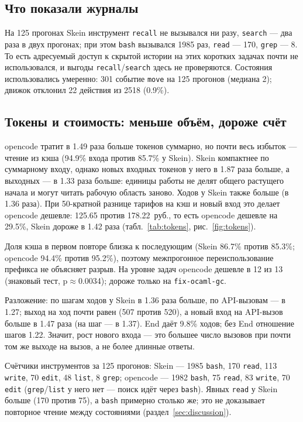 \documentclass[11pt,a4paper]{article}
\begin{document}
\subsection{Что показали журналы}

На 125 прогонах Skein инструмент \texttt{recall} не вызывался ни разу, \texttt{search} ---
два раза в двух прогонах; при этом \texttt{bash} вызывался 1985 раз, \texttt{read} --- 170,
\texttt{grep} --- 8. То есть адресуемый доступ к скрытой истории на этих коротких задачах
почти не использовался, и выгоды \texttt{recall}/\texttt{search} здесь не проверяются.
Состояния использовались умеренно: 301 событие \texttt{move} на 125 прогонов (медиана 2);
движок отклонил 22 действия из 2518 (0.9\%).

\subsection{Токены и стоимость: меньше объём, дороже счёт}

opencode тратит в 1.49 раза больше токенов суммарно, но почти весь избыток --- чтение из
кэша (94.9\% входа против 85.7\% у Skein). Skein компактнее по суммарному входу, однако
новых входных токенов у него в 1.87 раза больше, а выходных --- в 1.33 раза больше:
единицы работы не делят общего растущего начала и могут читать рабочую область заново.
Ходов у Skein также больше (в 1.36 раза). При 50-кратной разнице тарифов на кэш и новый
вход это делает opencode дешевле: 125.65 против 178.22~руб., то есть opencode дешевле на 29.5\%, Skein дороже в
1.42 раза (табл.~\ref{tab:tokens}, рис.~\ref{fig:tokens}).

Доля кэша в первом повторе близка к последующим (Skein 86.7\% против 85.3\%; opencode
94.4\% против 95.2\%), поэтому межпрогонное переиспользование префикса не объясняет разрыв.
На уровне задач opencode дешевле в 12 из 13 (знаковый тест, p$\approx$0.0034); дороже только
на \texttt{fix-ocaml-gc}.

Разложение: по шагам ходов у Skein в 1.36 раза больше, по API-вызовам --- в 1.27; выход на
ход почти равен (507 против 520), а новый вход на API-вызов больше в 1.47 раза (на шаг --- в
1.37). End даёт 9.8\% ходов; без End отношение шагов 1.22. Значит, рост нового входа --- это
большее число вызовов при почти том же выходе на вызов, а не более длинные ответы.

Счётчики инструментов за 125 прогонов: Skein --- 1985 \texttt{bash}, 170 \texttt{read},
113 \texttt{write}, 70 \texttt{edit}, 48 \texttt{list}, 8 \texttt{grep}; opencode ---
1982 \texttt{bash}, 75 \texttt{read}, 83 \texttt{write}, 70 \texttt{edit}
(\texttt{grep}/\texttt{list} у него нет — поиск идёт через \texttt{bash}). Явных
\texttt{read} у Skein больше (170 против 75), а \texttt{bash} примерно столько же; это не
доказывает повторное чтение между состояниями (раздел~\ref{sec:discussion}).
\end{document}

